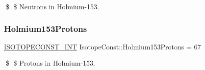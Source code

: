 \$ \$ Neutrons in Holmium-\/153. \mbox{\label{group___isotope_const-_holmium-_ho153_ga0e77d9c97c2af0f450efe35fa2ef4112}} 
\subsubsection{\texorpdfstring{Holmium153\+Protons}{Holmium153Protons}}
{\footnotesize\ttfamily \mbox{\hyperlink{group___isotope_const-_macros_ga5f18360b3e99483a35c32d789e62621c}{I\+S\+O\+T\+O\+P\+E\+C\+O\+N\+S\+T\+\_\+\+I\+NT}} Isotope\+Const\+::\+Holmium153\+Protons = 67}

\$ \$ Protons in Holmium-\/153. 